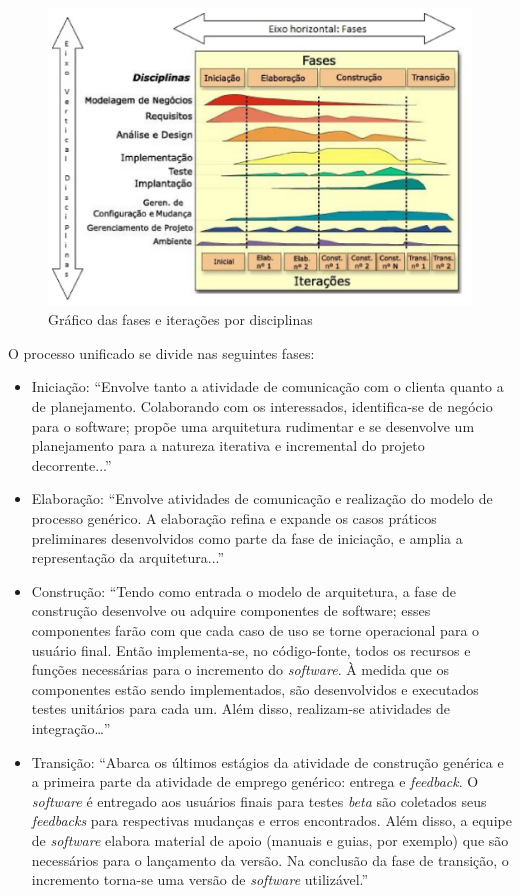 \begin{figure}[h]
\centering
  \includegraphics[keepaspectratio=true,scale=0.5]
  {figuras/fases_rup.eps}
  \caption{Gráfico das fases e iterações por disciplinas}
  \label{rup-phases}
\end{figure}

O processo unificado se divide nas seguintes fases:

\begin{itemize}
\item Iniciação: “Envolve tanto a atividade de comunicação com o clienta quanto a de planejamento. Colaborando com os interessados, identifica-se de negócio para o software; propõe uma arquitetura rudimentar e se desenvolve um planejamento para a natureza iterativa e incremental do projeto decorrente...”~\cite{pressman}
\item Elaboração: “Envolve atividades de comunicação e realização do modelo de processo genérico. A elaboração refina e expande os casos práticos preliminares desenvolvidos como parte da fase de iniciação, e amplia a representação da arquitetura...”~\cite{pressman}
\item Construção: “Tendo como entrada o modelo de arquitetura, a fase de construção desenvolve ou adquire componentes de software; esses componentes farão com que cada caso de uso se torne operacional para o usuário final. Então implementa-se, no código-fonte, todos os recursos e funções necessárias para o incremento do \textit{software}. À medida que os componentes estão sendo implementados, são desenvolvidos e executados testes unitários para cada um. Além disso, realizam-se atividades de integração…”~\cite{pressman}
\item Transição: “Abarca os últimos estágios da atividade de construção genérica e a primeira parte da atividade de emprego genérico: entrega e \textit{feedback}. O \textit{software} é entregado aos usuários finais para testes \textit{beta} são coletados seus \textit{feedbacks} para respectivas mudanças e erros encontrados. Além disso, a equipe de \textit{software} elabora material de apoio (manuais e guias, por exemplo) que são necessários para o lançamento da versão. Na conclusão da fase de transição, o incremento torna-se uma versão de \textit{software} utilizável.”~\cite{pressman}
\end{itemize}

